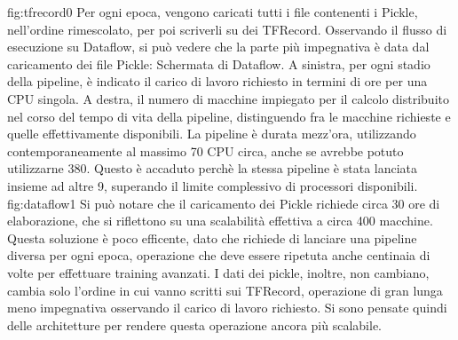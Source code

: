 {fig:tfrecord0}
Per ogni epoca, vengono caricati tutti i file contenenti i Pickle, nell’ordine rimescolato, per poi scriverli su dei TFRecord. Osservando il flusso di esecuzione su Dataflow, si può vedere che la parte più impegnativa è data dal caricamento dei file Pickle:
{Schermata di Dataflow. A sinistra, per ogni stadio della pipeline, è indicato il carico di lavoro richiesto in termini di ore per una CPU singola. A destra, il numero di macchine impiegato per il calcolo distribuito nel corso del tempo di vita della pipeline, distinguendo fra le macchine richieste e quelle effettivamente disponibili. La pipeline è durata mezz'ora, utilizzando contemporaneamente al massimo 70 CPU circa, anche se avrebbe potuto utilizzarne 380. Questo è accaduto perchè la stessa pipeline è stata lanciata insieme ad altre 9, superando il limite complessivo di processori disponibili. }
{fig:dataflow1}
Si può notare che il caricamento dei Pickle richiede circa 30 ore di elaborazione, che si riflettono su una scalabilità effettiva a circa 400 macchine. Questa soluzione è poco efficente, dato che richiede di lanciare una pipeline diversa per ogni epoca, operazione che deve essere ripetuta anche centinaia di volte per effettuare training avanzati. I dati dei pickle, inoltre, non cambiano, cambia solo l’ordine in cui vanno scritti sui TFRecord, operazione di gran lunga meno impegnativa osservando il carico di lavoro richiesto. Si sono pensate quindi delle architetture per rendere questa operazione ancora più scalabile.
